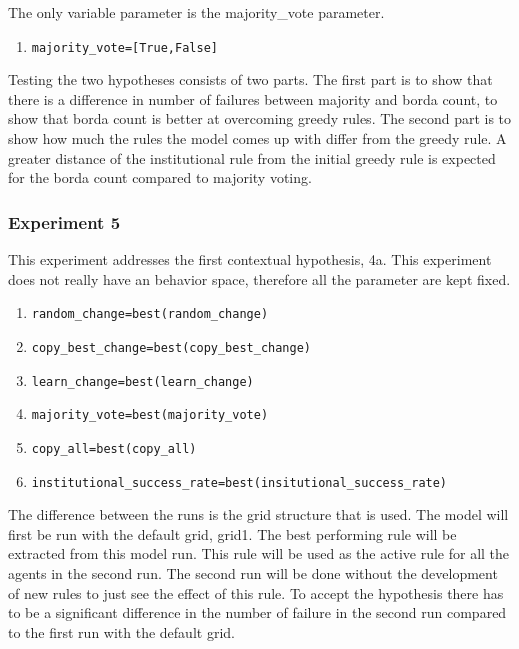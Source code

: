 \documentclass[a4paper]{article}
\begin{document}
The only variable parameter is the majority\_vote parameter.
\begin{enumerate}
 \item  \begin{alltt} majority_vote = [True, False] \end{alltt}
\end{enumerate}


Testing the two hypotheses consists of two parts. The first part is to show that there 
is a difference in number of failures between majority and borda count, to show that
borda count is better at overcoming greedy rules. The second part is to show how much the rules
the model comes up with differ from the greedy rule. A greater distance of the institutional rule 
from the initial greedy rule is expected for the borda count compared to majority voting. 

\subsubsection{Experiment 5}
This experiment addresses the first contextual hypothesis, 4a. This experiment does not really have 
an behavior space, therefore all the parameter are kept fixed. 
\begin{enumerate}
 \item \begin{alltt}random_change  = best(random_change)\end{alltt}
 \item \begin{alltt}copy_best_change = best(copy_best_change)\end{alltt}
 \item \begin{alltt}learn_change = best(learn_change)\end{alltt}
 \item \begin{alltt}majority_vote = best(majority_vote)\end{alltt}
 \item \begin{alltt}copy_all = best(copy_all)\end{alltt}
 \item \begin{alltt}institutional_success_rate = best(insitutional_success_rate)\end{alltt}
\end{enumerate}

The difference between the runs is the grid structure that is used. The model will first be run with the default grid, grid1.
The best performing rule will be extracted from this model run. This rule will be used as the active rule for all the 
agents in the second run. The second run will be done without the development of new rules  to just see the effect 
of this rule. 
To accept the hypothesis there has to be a significant difference in the number of failure in the second run compared 
to the first run with the default grid. 
\end{document}
